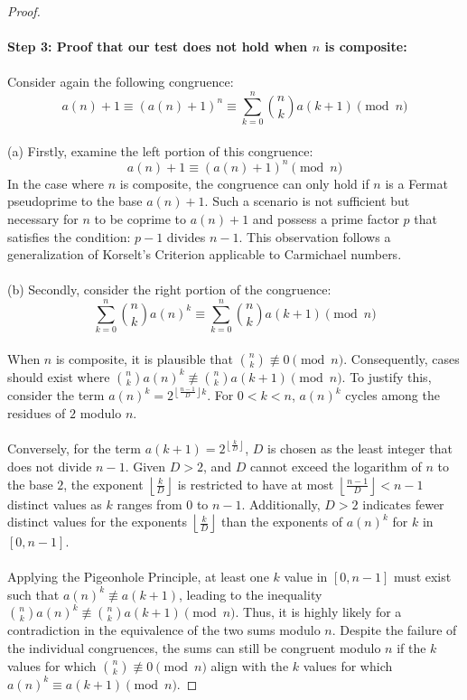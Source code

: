 \documentclass{article}
\theoremstyle{plain}
\begin{document}
\begin{proof}
\\
\\
\textbf{Step 3: Proof that our test does not hold when $n$ is composite:}
\\
\\
Consider again the following congruence:
$$a(n) + 1 \equiv (a(n) + 1)^{n} \equiv \sum_{k=0}^{n} \binom{n}{k}a(k+1) \pmod{n}$$
\\
(a) Firstly, examine the left portion of this congruence:
$$a(n) + 1 \equiv (a(n) + 1)^{n} \pmod{n}$$
In the case where $n$ is composite, the congruence can only hold if $n$ is a Fermat pseudoprime to the base $a(n)+1$. Such a scenario is not sufficient but necessary for $n$ to be coprime to $a(n)+1$ and possess a prime factor $p$ that satisfies the condition: $p-1$ divides $n-1$. This observation follows a generalization of Korselt's Criterion applicable to Carmichael numbers.
\\
\\
(b) Secondly, consider the right portion of the congruence:
\\
$$\sum_{k=0}^{n} \binom{n}{k}a(n)^k \equiv \sum_{k=0}^{n} \binom{n}{k}a(k+1) \pmod{n}$$
\\
When $n$ is composite, it is plausible that $\binom{n}{k} \not\equiv 0 \pmod{n}$. Consequently, cases should exist where $\binom{n}{k}a(n)^k \not\equiv \binom{n}{k}a(k+1) \pmod{n}$. To justify this, consider the term $a(n)^k = 2^{\left\lfloor \frac{n-1}{D} \right\rfloor k}$. For $0 < k < n$, $a(n)^k$ cycles among the residues of $2$ modulo $n$. 
\\
\\
Conversely, for the term $a(k+1) = 2^{\left\lfloor \frac{k}{D} \right\rfloor}$, $D$ is chosen as the least integer that does not divide $n-1$. Given $D > 2$, and $D$ cannot exceed the logarithm of $n$ to the base $2$, the exponent $\left\lfloor \frac{k}{D} \right\rfloor$ is restricted to have at most $\left\lfloor \frac{n-1}{D} \right\rfloor < n-1$ distinct values as $k$ ranges from $0$ to $n-1$. Additionally, $D > 2$ indicates fewer distinct values for the exponents $\left\lfloor \frac{k}{D} \right\rfloor$ than the exponents of $a(n)^k$ for $k$ in $[0, n-1]$.
\\
\\
Applying the Pigeonhole Principle, at least one $k$ value in $[0, n-1]$ must exist such that $a(n)^{k} \not\equiv a(k+1)$, leading to the inequality $\binom{n}{k}a(n)^k \not\equiv \binom{n}{k}a(k+1) \pmod{n}$. Thus, it is highly likely for a contradiction in the equivalence of the two sums modulo $n$. Despite the failure of the individual congruences, the sums can still be congruent modulo $n$ if the $k$ values for which $\binom{n}{k} \not\equiv 0 \pmod{n}$ align with the $k$ values for which $a(n)^k \equiv a(k+1) \pmod{n}$.

\end{proof}
\end{document}
